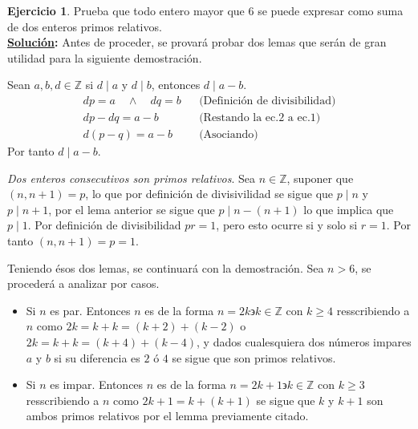 \documentclass[11pt,letterpaper]{article}
\theoremstyle{definition}\newtheorem{p}{Ejercicio}
\theoremstyle{definition}\newtheorem{pp}[p]{$(*)$Ejercicio}
\numberwithin{p}{section}
\newcommand{\Z}{\mathbb{Z}}
\newcommand{\sol}{\textbf{\underline{Solución}: }} %
\begin{document}
%
\begin{p}
  Prueba que todo entero mayor que 6 se puede expresar como suma de dos enteros primos relativos.\\
  \sol Antes de proceder, se provará probar dos lemas que serán de gran utilidad para la siguiente demostración.
  \begin{lemma}
  Sean $a, b, d \in \Z$ si $d \mid a$ y $d \mid b$, entonces $d \mid a-b$.
  \begin{align*}
  dp = a \quad \land \quad dq=b && \text{(Definición de divisibilidad)}\\ 
  dp - dq = a -b && \text{(Restando la ec.2 a ec.1)}\\
  d(p-q) = a-b && \text{(Asociando)}
  \end{align*}
  Por tanto $d \mid a-b$.
  \end{lemma}
  \begin{lemma}
  \emph{Dos enteros consecutivos son primos relativos}. Sea $n \in \Z$, suponer que $(n, n+1)=p$, lo que
  por definición de divisivilidad se sigue que $p \mid n$ y $p \mid n+1$, por el lema anterior se sigue que
  $p \mid n - (n+1)$ lo que implica que  $p \mid 1$. Por definición de divisibilidad $pr=1$, pero esto ocurre
  si y solo si $r=1$. Por tanto $(n, n+1)=p=1$.
  \end{lemma}
  
  Teniendo ésos dos lemas, se continuará con la demostración. Sea $n>6$, se procederá a analizar por casos.
  \begin{itemize}
    \item Si $n$ es par. Entonces $n$ es de la forma $n=2k \backepsilon k \in \Z$ con $k \geq 4$
    resscribiendo a $n$ como $2k=k+k=(k+2)+(k-2)$ o $2k=k+k=(k+4)+(k-4)$, y  dados cualesquiera
    dos números impares $a$ y $b$ si su diferencia es $2$ ó $4$ se sigue que son primos relativos.
    \item Si $n$ es impar. Entonces $n$ es de la forma $n=2k+1 \backepsilon k \in \Z$ con $k \geq 3$ 
    resscribiendo a $n$ como $2k+1= k + (k +1)$ se sigue que $k$ y $k+1$ son ambos primos relativos
    por el lemma previamente citado.
    
  \end{itemize}
\end{p}
%
\end{document}
